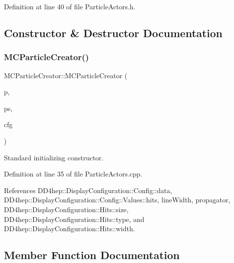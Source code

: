 Definition at line 40 of file Particle\+Actors.\+h.



\subsection{Constructor \& Destructor Documentation}
\hypertarget{struct_d_d4hep_1_1_m_c_particle_creator_a2fcb384a14cbc919c57f6774cf6c20f3}{}\label{struct_d_d4hep_1_1_m_c_particle_creator_a2fcb384a14cbc919c57f6774cf6c20f3} 
\subsubsection{\texorpdfstring{M\+C\+Particle\+Creator()}{MCParticleCreator()}}
{\footnotesize\ttfamily M\+C\+Particle\+Creator\+::\+M\+C\+Particle\+Creator (\begin{DoxyParamCaption}\item[{T\+Eve\+Track\+Propagator $\ast$}]{p,  }\item[{T\+Eve\+Compound $\ast$}]{ps,  }\item[{const \hyperlink{class_d_d4hep_1_1_display_configuration_1_1_config}{Display\+Configuration\+::\+Config} $\ast$}]{cfg }\end{DoxyParamCaption})}



Standard initializing constructor. 



Definition at line 35 of file Particle\+Actors.\+cpp.



References D\+D4hep\+::\+Display\+Configuration\+::\+Config\+::data, D\+D4hep\+::\+Display\+Configuration\+::\+Config\+::\+Values\+::hits, line\+Width, propagator, D\+D4hep\+::\+Display\+Configuration\+::\+Hits\+::size, D\+D4hep\+::\+Display\+Configuration\+::\+Hits\+::type, and D\+D4hep\+::\+Display\+Configuration\+::\+Hits\+::width.



\subsection{Member Function Documentation}
\hypertarget{struct_d_d4hep_1_1_m_c_particle_creator_a282bb825147fa28733679bc6ed5a9afe}{}\label{struct_d_d4hep_1_1_m_c_particle_creator_a282bb825147fa28733679bc6ed5a9afe} 
